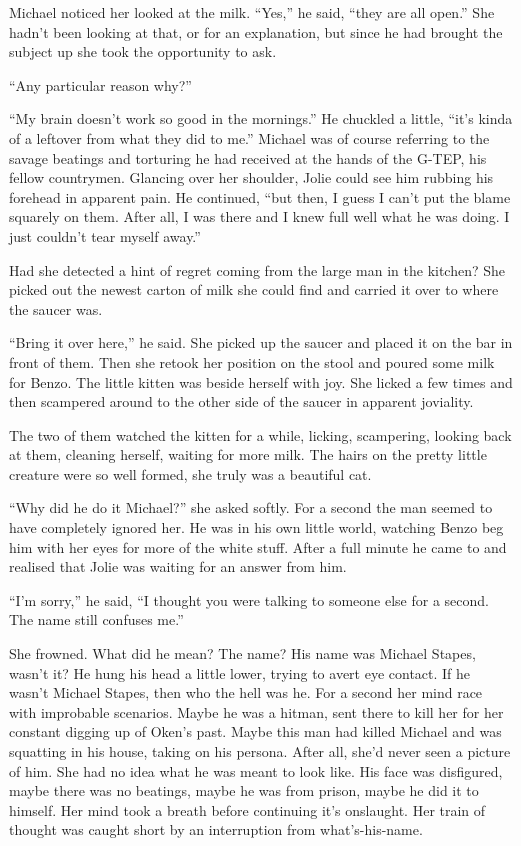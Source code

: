 Michael noticed her looked at the milk.  ``Yes,'' he said, ``they are all open.''  She hadn't been looking at that, or for an explanation, but since he had brought the subject up she took the opportunity to ask.

``Any particular reason why?''

``My brain doesn't work so good in the mornings.''  He chuckled a little, ``it's kinda of a leftover from what they did to me.''  Michael was of course referring to the savage beatings and torturing he had received at the hands of the G-TEP, his fellow countrymen.  Glancing over her shoulder, Jolie could see him rubbing his forehead in apparent pain.  He continued, ``but then, I guess I can't put the blame squarely on them.  After all, I was there and I knew full well what he was doing.  I just couldn't tear myself away.''

Had she detected a hint of regret coming from the large man in the kitchen?  She picked out the newest carton of milk she could find and carried it over to where the saucer was.  

``Bring it over here,'' he said.  She picked up the saucer and placed it on the bar in front of them.  Then she retook her position on the stool and poured some milk for Benzo.  The little kitten was beside herself with joy.  She licked a few times and then scampered around to the other side of the saucer in apparent joviality.  

The two of them watched the kitten for a while, licking, scampering, looking back at them, cleaning herself, waiting for more milk.  The hairs on the pretty little creature were so well formed, she truly was a beautiful cat.

``Why did he do it Michael?'' she asked softly.  For a second the man seemed to have completely ignored her.  He was in his own little world, watching Benzo beg him with her eyes for more of the white stuff.  After a full minute he came to and realised that Jolie was waiting for an answer from him.

``I'm sorry,'' he said, ``I thought you were talking to someone else for a second.  The name still confuses me.''  

She frowned.  What did he mean?  The name?  His name was Michael Stapes, wasn't it?  He hung his head a little lower, trying to avert eye contact.  If he wasn't Michael Stapes, then who the hell was he.  For a second her mind race with improbable scenarios.  Maybe he was a hitman, sent there to kill her for her constant digging up of Oken's past.  Maybe this man had killed Michael and was squatting in his house, taking on his persona.  After all, she'd never seen a picture of him.  She had no idea what he was meant to look like.  His face was disfigured, maybe there was no beatings, maybe he was from prison, maybe he did it to himself.  Her mind took a breath before continuing it's onslaught.  Her train of thought was caught short by an interruption from what's-his-name.  

